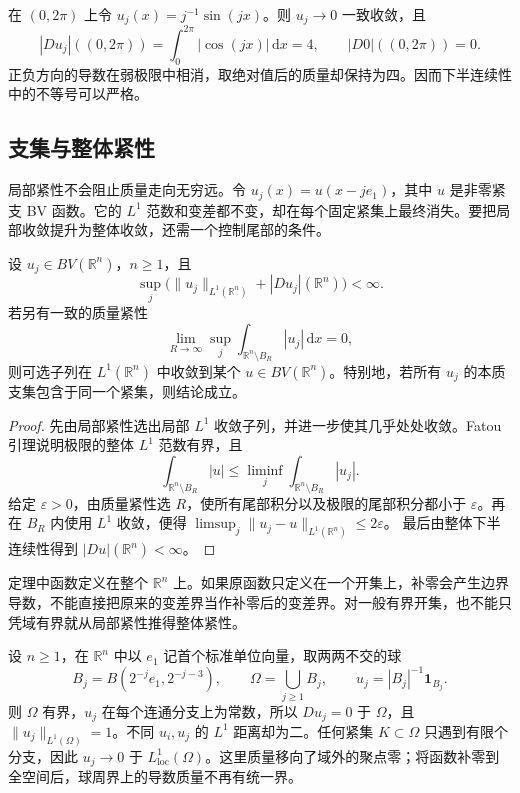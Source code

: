 \begin{example}\label{g3:exm:bv-variation-loss}
	在 \((0,2\pi)\) 上令 \(u_j(x)=j^{-1}\sin(jx)\)。则 \(u_j\to0\) 一致收敛，且
	\[
		|Du_j|((0,2\pi))=\int_0^{2\pi}|\cos(jx)|\,\mathrm dx=4,
		\qquad |D0|((0,2\pi))=0.
	\]
	正负方向的导数在弱极限中相消，取绝对值后的质量却保持为四。因而下半连续性中的不等号可以严格。
\end{example}

\subsection{支集与整体紧性}
\label{g3:subsec:2102:03}
局部紧性不会阻止质量走向无穷远。令 \(u_j(x)=u(x-je_1)\)，其中 \(u\) 是非零紧支 BV 函数。它的 \(L^1\) 范数和变差都不变，却在每个固定紧集上最终消失。要把局部收敛提升为整体收敛，还需一个控制尾部的条件。

\begin{theorem}\label{g3:thm:bv-global-compactness}
	设 \(u_j\in BV(\mathbb R^n)\)，\(n\ge1\)，且
	\[
		\sup_j\bigl(\|u_j\|_{L^1(\mathbb R^n)}
		+|Du_j|(\mathbb R^n)\bigr)<\infty.
	\]
	若另有一致的质量紧性
	\begin{equation}\label{g3:eq:bv-tightness}
		\lim_{R\to\infty}\sup_j
		\int_{\mathbb R^n\setminus B_R}|u_j|\,\mathrm dx=0,
	\end{equation}
	则可选子列在 \(L^1(\mathbb R^n)\) 中收敛到某个 \(u\in BV(\mathbb R^n)\)。特别地，若所有 \(u_j\) 的本质支集包含于同一个紧集，则结论成立。
\end{theorem}
\begin{proof}
	先由局部紧性选出局部 \(L^1\) 收敛子列，并进一步使其几乎处处收敛。Fatou 引理说明极限的整体 \(L^1\) 范数有界，且
	\[
		\int_{\mathbb R^n\setminus B_R}|u|
		\le\liminf_j\int_{\mathbb R^n\setminus B_R}|u_j|.
	\]
	给定 \(\varepsilon>0\)，由质量紧性选 \(R\)，使所有尾部积分以及极限的尾部积分都小于 \(\varepsilon\)。再在 \(B_R\) 内使用 \(L^1\) 收敛，便得
	\(\limsup_j\|u_j-u\|_{L^1(\mathbb R^n)}\le2\varepsilon\)。
	最后由整体下半连续性得到 \(|Du|(\mathbb R^n)<\infty\)。
\end{proof}

定理中函数定义在整个 \(\mathbb R^n\) 上。如果原函数只定义在一个开集上，补零会产生边界导数，不能直接把原来的变差界当作补零后的变差界。对一般有界开集，也不能只凭域有界就从局部紧性推得整体紧性。

\begin{example}\label{g3:exm:bv-domain-boundary-escape}
	设 \(n\ge1\)，在 \(\mathbb R^n\) 中以 \(e_1\) 记首个标准单位向量，取两两不交的球
	\[
		B_j=B(2^{-j}e_1,2^{-j-3}),\qquad
		\Omega=\bigcup_{j\ge1}B_j,\qquad
		u_j=|B_j|^{-1}\mathbf1_{B_j}.
	\]
	则 \(\Omega\) 有界，\(u_j\) 在每个连通分支上为常数，所以 \(Du_j=0\) 于 \(\Omega\)，且 \(\|u_j\|_{L^1(\Omega)}=1\)。不同 \(u_i,u_j\) 的 \(L^1\) 距离却为二。任何紧集 \(K\subset\Omega\) 只遇到有限个分支，因此 \(u_j\to0\) 于 \(L^1_{\mathrm{loc}}(\Omega)\)。这里质量移向了域外的聚点零；将函数补零到全空间后，球周界上的导数质量不再有统一界。
\end{example}

